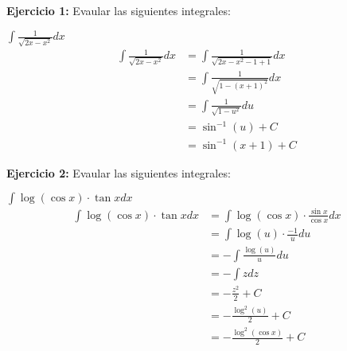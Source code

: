 \documentclass[../main.tex]{subfiles}
\begin{document}
    \question \textbf{Ejercicio 1:} Evaular las siguientes integrales:
    \begin{partes}
        \parte $\int \frac{1}{\sqrt{2x-x^2}} dx$
        \begin{align*}
            \int \frac{1}{\sqrt{2x-x^2}} dx &= \int \frac{1}{\sqrt{2x-x^2-1+1}} dx\\
            &= \int \frac{1}{\sqrt{1-(x+1)^2}} dx\\
            &= \int \frac{1}{\sqrt{1-u^2}} du\\
            &= \sin^{-1}(u) + C\\
            &= \sin^{-1}(x+1) + C
        \end{align*}
    \end{partes}

    \question \textbf{Ejercicio 2:} Evaular las siguientes integrales:
    \begin{partes}
        \parte $\int \log(\cos x) \cdot \tan x dx$
        \begin{align*}
            \int \log(\cos x) \cdot \tan x dx &= \int \log(\cos x) \cdot \frac{\sin x}{\cos x} dx\\
            &= \int \log(u) \cdot \frac{-1}{u} du\\
            &= - \int \frac{\log(u)}{u} du\\
            &= - \int z dz\\
            &= - \frac{z^2}{2} + C\\
            &= - \frac{\log^2(u)}{2} + C\\
            &= - \frac{\log^2(\cos x)}{2} + C
        \end{align*}
    \end{partes}
\end{document}
